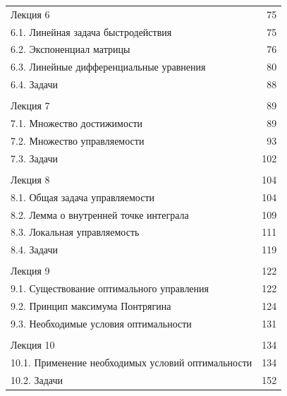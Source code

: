 \documentclass[8pt]{extarticle}
\begin{document}
\clearpage

\begin{tabularx}{\textwidth}{@{}Xr@{}}
Лекция 6 & 75 \\
\hspace*{1em}6.1. Линейная задача быстродействия & 75 \\
\hspace*{1em}6.2. Экспоненциал матрицы & 76 \\
\hspace*{1em}6.3. Линейные дифференциальные уравнения & 80 \\
\hspace*{1em}6.4. Задачи & 88 \\
& \\
Лекция 7 & 89 \\
\hspace*{1em}7.1. Множество достижимости & 89 \\
\hspace*{1em}7.2. Множество управляемости & 93 \\
\hspace*{1em}7.3. Задачи & 102 \\
& \\
Лекция 8 & 104 \\
\hspace*{1em}8.1. Общая задача управляемости & 104 \\
\hspace*{1em}8.2. Лемма о внутренней точке интеграла & 109 \\
\hspace*{1em}8.3. Локальная управляемость & 111 \\
\hspace*{1em}8.4. Задачи & 119 \\
& \\
Лекция 9 & 122 \\
\hspace*{1em}9.1. Существование оптимального управления & 122 \\
\hspace*{1em}9.2. Принцип максимума Понтрягина & 124 \\
\hspace*{1em}9.3. Необходимые условия оптимальности & 131 \\
& \\
Лекция 10 & 134 \\
\hspace*{1em}10.1. Применение необходимых условий оптимальности & 134 \\
\hspace*{1em}10.2. Задачи & 152 \\

\end{tabularx}
\end{document}
